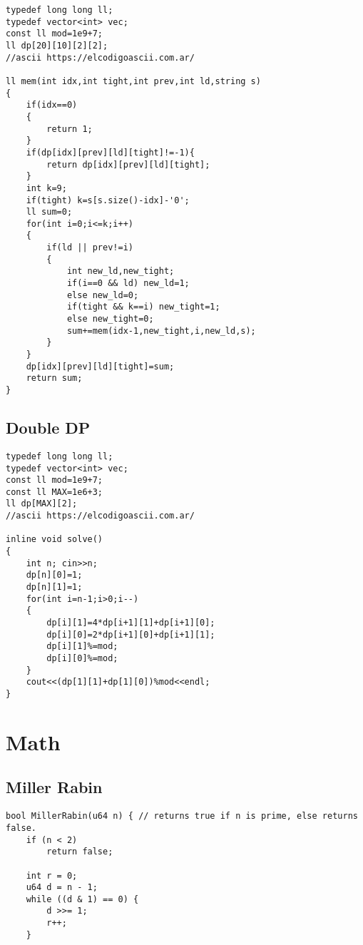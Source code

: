 \documentclass[10pt]{article}
\begin{document}
\begin{multicols*}{2}
\begin{lstlisting}[style=compactcpp]
typedef long long ll;
typedef vector<int> vec;
const ll mod=1e9+7;
ll dp[20][10][2][2];
//ascii https://elcodigoascii.com.ar/

ll mem(int idx,int tight,int prev,int ld,string s)
{
    if(idx==0)
    {
        return 1;
    }
    if(dp[idx][prev][ld][tight]!=-1){
        return dp[idx][prev][ld][tight];
    }
    int k=9;
    if(tight) k=s[s.size()-idx]-'0';
    ll sum=0;
    for(int i=0;i<=k;i++)
    {
        if(ld || prev!=i)
        {
            int new_ld,new_tight;
            if(i==0 && ld) new_ld=1;
            else new_ld=0;
            if(tight && k==i) new_tight=1;
            else new_tight=0;
            sum+=mem(idx-1,new_tight,i,new_ld,s);
        }
    }
    dp[idx][prev][ld][tight]=sum;
    return sum;
}
\end{lstlisting}

\subsection{Double DP}

\begin{lstlisting}[style=compactcpp]
typedef long long ll;
typedef vector<int> vec;
const ll mod=1e9+7;
const ll MAX=1e6+3;
ll dp[MAX][2];
//ascii https://elcodigoascii.com.ar/

inline void solve()
{
    int n; cin>>n;
    dp[n][0]=1;
    dp[n][1]=1;
    for(int i=n-1;i>0;i--)
    {
        dp[i][1]=4*dp[i+1][1]+dp[i+1][0];
        dp[i][0]=2*dp[i+1][0]+dp[i+1][1];
        dp[i][1]%=mod;
        dp[i][0]%=mod;
    }
    cout<<(dp[1][1]+dp[1][0])%mod<<endl;
}
\end{lstlisting}

\section{Math}

\subsection{Miller Rabin }

\begin{lstlisting}[style=compactcpp]
bool MillerRabin(u64 n) { // returns true if n is prime, else returns false.
    if (n < 2)
        return false;

    int r = 0;
    u64 d = n - 1;
    while ((d & 1) == 0) {
        d >>= 1;
        r++;
    }


\end{lstlisting}
\end{multicols*}
\end{document}
